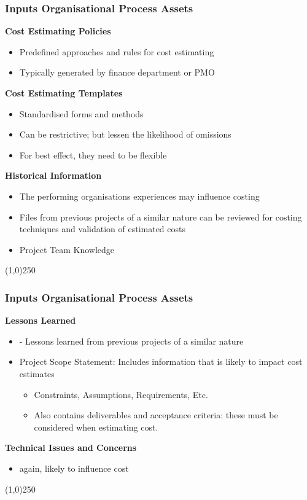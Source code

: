\begin{frame}
\frametitle{Inputs \hfill Organisational Process Assets}
\textbf{Cost Estimating Policies}
\begin{itemize}
	\item Predefined approaches and rules for cost estimating
	\item Typically generated by finance department or PMO
\end{itemize}
\textbf{Cost Estimating Templates}
\begin{itemize}
	\item Standardised forms and methods
	\item Can be restrictive; but lessen the likelihood of omissions
	\item For best effect, they need to be flexible
\end{itemize}
\textbf{Historical Information}
\begin{itemize}
	\item The performing organisations experiences may influence costing
	\item Files from previous projects of a similar nature can be reviewed for costing techniques and validation of estimated costs
	\item Project Team Knowledge
\end{itemize}
\end{frame}
\begin{center}\line(1,0){250}\end{center}








\begin{frame}
\frametitle{Inputs \hfill\hfill Organisational Process Assets}
\textbf{Lessons Learned}
\begin{itemize}
	\item - Lessons learned from previous projects of a similar nature
	\item Project Scope Statement: Includes information that is likely to impact cost estimates
		\begin{itemize}
			\item Constraints, Assumptions, Requirements, Etc.
			\item Also contains deliverables and acceptance criteria: these must be considered when estimating cost.
		\end{itemize}
\end{itemize}
\textbf{Technical Issues and Concerns}
\begin{itemize}
	\item again, likely to influence cost 
\end{itemize}
\end{frame}
\begin{center}\line(1,0){250}\end{center}








